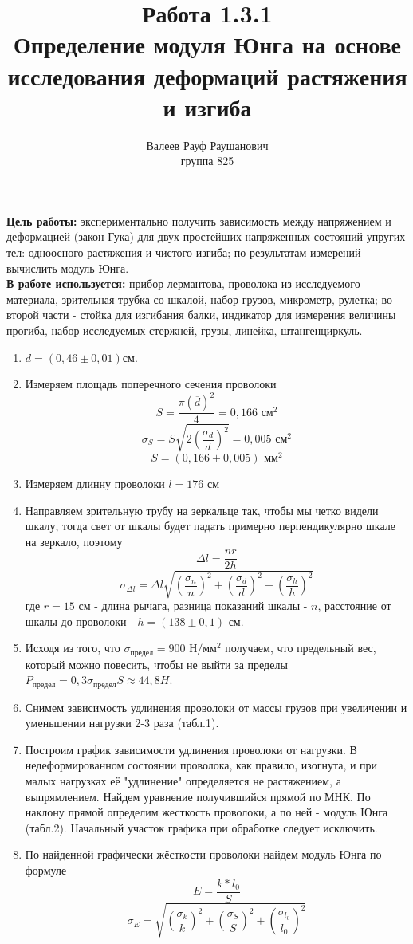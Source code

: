 \documentclass[a4paper, 10pt]{article}%
\author{Валеев Рауф Раушанович \\
группа 825}
\title{Работа 1.3.1 \\
Определение модуля Юнга на основе исследования деформаций растяжения и изгиба}
\begin{document}
\maketitle
\newpage
\textbf{Цель работы:} экспериментально получить зависимость между напряжением и деформацией (закон Гука) для двух простейших напряженных состояний упругих тел: одноосного растяжения и чистого изгиба; по результатам измерений вычислить модуль Юнга. \\
\textbf{В работе используется:} прибор лермантова, проволока из исследуемого материала, зрительная трубка со шкалой, набор грузов, микрометр, рулетка; во второй части - стойка для изгибания балки, индикатор для измерения величины прогиба, набор исследуемых стержней, грузы, линейка, штангенциркуль.
\begin{figure}[h]
\end{figure}
\begin{enumerate}
\item $d = (0,46 \pm 0,01) \text{см}$.
\item Измеряем площадь поперечного сечения проволоки
\[S =\dfrac{ \pi (\overline{d})^2}{4} = 0,166 \text{ см}^2\]
\[\sigma_S = S\sqrt{2\left( \dfrac{\sigma_d}{d}\right) ^2} = 0,005 \text{ см}^2\]
\[S = (0,166\pm0,005) \text{ мм}^2\]
\item Измеряем длинну проволоки $l = 176  \text{ см}$
\item Направляем зрительную трубу на зеркальце так, чтобы мы четко видели шкалу, тогда свет от шкалы будет падать примерно перпендикулярно шкале на зеркало, поэтому
\[\Delta l =\dfrac{nr}{2h}\]
\[ \sigma_{\Delta l} = \Delta l\sqrt{\left( \dfrac{\sigma_{n}}{n}\right)^2 + \left(\dfrac{\sigma_d}{d}\right)^2+\left(\dfrac{\sigma_h}{h}\right)^2} \]
где $r = 15$ см - длина рычага, разница показаний шкалы - $n$, расстояние от шкалы до проволоки - $h = (138\pm0,1)\text{ см}$.
\item Исходя из того, что $\sigma_{\text{предел}} = 900 \text{ Н}/\text{мм}^2$ получаем, что предельный вес, который можно повесить, чтобы не выйти за пределы $P_{\text{предел}} = 0,3 \sigma_{\text{предел}} S \approx 44,8 H$. 
\item Снимем зависимость удлинения проволоки от массы грузов при увеличении и уменьшении нагрузки 2-3 раза (табл.1). 
\item Построим график зависимости удлинения проволоки от нагрузки. В недеформированном состоянии проволока, как правило, изогнута, и при малых нагрузках её "удлинение" определяется не растяжением, а выпрямлением. Найдем уравнение получившийся прямой по МНК. По наклону прямой определим жесткость проволоки, а по ней - модуль Юнга (табл.2). Начальный участок графика при обработке следует исключить. 
\item По найденной графически жёсткости проволоки найдем модуль Юнга по формуле
\[E = \dfrac{k*l_0}{S}\]
\[\sigma_E = \sqrt{\left( \dfrac{\sigma_{k}}{k} \right)^2 + \left( \dfrac{\sigma_{S}}{S} \right)^2 + \left( \dfrac{\sigma_{l_0}}{l_0} \right)^2 }\]
\end{enumerate}
\end{document}
